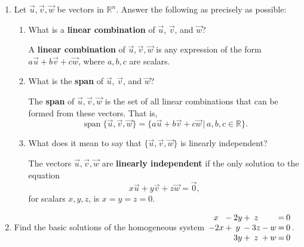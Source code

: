 \documentclass[12pt]{article}
\newcommand{\R}{\mathbb{R}}
\begin{document}
 \begin{enumerate}
\item Let $\vec{u},\vec{v},\vec{w}$ be vectors in $\R^n$. Answer the following as precisely as possible:
\begin{enumerate}
\item What is a \textbf{linear combination} of $\vec{u}$, $\vec{v}$, and $\vec{w}$?

A \textbf{linear combination} of $\vec{u},\vec{v},\vec{w}$ is any expression of the form $a\vec{u}+b\vec{v}+c\vec{w}$, where $a,b,c$ are scalars.

\item What is the \textbf{span} of $\vec{u}$, $\vec{v}$, and $\vec{w}$?

The \textbf{span} of $\vec{u},\vec{v},\vec{w}$ is the set of all linear combinations that can be formed from these vectors. That is,
\[
\operatorname{span}\{\vec{u},\vec{v},\vec{w}\} = \{a\vec{u}+b\vec{v}+c\vec{w}\,|\, a,b,c\in\R\}.
\]

\item What does it mean to say that $\{\vec{u},\vec{v},\vec{w}\}$ is linearly independent?

The vectors $\vec{u},\vec{v},\vec{w}$ are \textbf{linearly independent} if the only solution to the equation
\[
x\vec{u}+y\vec{v}+z\vec{w}=\vec{0},
\]
for scalars $x,y,z$, is $x=y=z=0$.


\end{enumerate}
\item Find the basic solutions of the homogeneous system \hspace{24pt} $\arraycolsep1pt
\begin{array}{ccccccccc}
x&-&2y&+&z& & &=&0\\
-2x&+&y&-&3z&-&w&=&0\\
 & &3y&+&z&+&w&=&0
\end{array}
$.


\end{enumerate}
\end{document}
